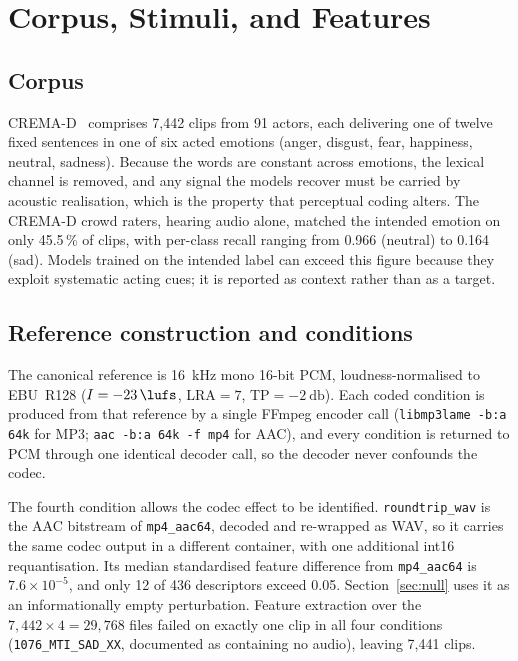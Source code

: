 \documentclass[lettersize,journal]{IEEEtran}
\newcommand{\ttf}[1]{\texttt{\footnotesize #1}}
\begin{document}
\section{Corpus, Stimuli, and Features}\label{sec:design}



\subsection{Corpus}
CREMA-D~\cite{cao2014cremad} comprises 7{,}442 clips from 91 actors, each
delivering one of twelve fixed sentences in one of six acted emotions (anger,
disgust, fear, happiness, neutral, sadness). Because the words are constant
across emotions, the lexical channel is removed, and any signal the models
recover must be carried by acoustic realisation, which is the property that
perceptual coding alters. The CREMA-D crowd raters, hearing audio alone,
matched the intended emotion on only 45.5\,\% of clips, with per-class recall
ranging from 0.966 (neutral) to 0.164 (sad). Models trained on the intended
label can exceed this figure because they exploit systematic acting cues; it is
reported as context rather than as a target.

\subsection{Reference construction and conditions}
The canonical reference is \SI{16}{\kilo\hertz} mono 16-bit PCM,
loudness-normalised to EBU~R128 ($I=\SI{-23}{\lufs}$, LRA${}=7$,
TP${}=\SI{-2}{\decibel}$). Each coded condition is produced from that reference
by a single FFmpeg encoder call (\ttf{libmp3lame -b:a 64k} for MP3;
\ttf{aac -b:a 64k -f mp4} for AAC), and every condition is returned to PCM
through one identical decoder call, so the decoder never confounds the codec.

The fourth condition allows the codec effect to be identified.
\ttf{roundtrip\_wav} is the AAC bitstream of \ttf{mp4\_aac64}, decoded and
re-wrapped as WAV, so it carries the same codec output in a different
container, with one additional int16 requantisation. Its median standardised feature difference from
\ttf{mp4\_aac64} is $7.6\times10^{-5}$, and only 12 of 436 descriptors exceed
0.05. Section~\ref{sec:null} uses it as an informationally empty perturbation.
Feature extraction over the $7{,}442\times4=29{,}768$ files failed on exactly
one clip in all four conditions (\ttf{1076\_MTI\_SAD\_XX}, documented as
containing no audio), leaving 7{,}441 clips.
\end{document}
